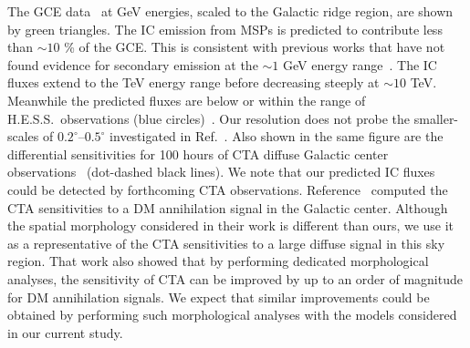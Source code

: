 \documentclass[doublespace,nopageskip]{VTthesis} %
\begin{document}
The GCE data~\cite{Macias:2014sta} at GeV energies, scaled to the Galactic ridge region, are shown by green triangles. The IC emission from MSPs is predicted to contribute less than $\sim 10$ \% of the GCE. This is consistent with previous works that have not found evidence for secondary emission at the $\sim 1$ GeV energy range~\cite{Lacroix:2015wfx}. The IC fluxes extend to the TeV energy range before decreasing steeply at $\sim 10$ TeV. Meanwhile the predicted fluxes are below or within the range of H.E.S.S.~observations (blue circles)~\cite{Aharonian:2006au}. Our resolution does not probe the smaller-scales of $0.2^\circ$--$0.5^\circ$ investigated in Ref.~\cite{Hooper:2018fih}. Also shown in the same figure are the differential sensitivities for 100 hours of CTA diffuse Galactic center observations~\cite{Silverwood:2014yza} (dot-dashed black lines). We note that our predicted IC fluxes could be detected by forthcoming CTA observations. Reference~\cite{Silverwood:2014yza} computed the CTA sensitivities to a DM annihilation signal in the Galactic center. Although the spatial morphology considered in their work is different than ours, we use it as a representative of the CTA sensitivities to a large diffuse signal in this sky region. That work also showed that by performing dedicated morphological analyses, the sensitivity of CTA can be improved by up to an order of magnitude for DM annihilation signals. We expect that similar improvements could be obtained by performing such morphological analyses with the models considered in our current study.
\end{document}
